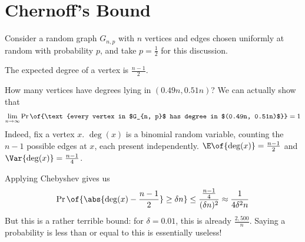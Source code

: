\section{Chernoff's Bound}

Consider a random graph $G_{n, p}$ with $n$ vertices and edges chosen uniformly at random with probability $p$, and take $p = \frac{1}{2}$ for this discussion.

The expected degree of a vertex is $\frac{n-1}{2}$.

How many vertices have degrees lying in $(0.49n, 0.51n)$? We can actually show that
\begin{align*}
    \lim_{n \to \infty} \Pr\of{\text{every vertex in $G_{n, p}$ has degree in $(0.49n, 0.51n)$}} = 1
\end{align*}
Indeed, fix a vertex $x$. $\deg(x)$ is a binomial random variable, counting the $n - 1$ possible edges at $x$, each present independently. $\E\of{\deg(x)} = \frac{n-1}{2}$ and $\Var{\deg(x)} = \frac{n-1}{4}$.

Applying Chebyshev gives us
\begin{align*}
    \Pr\of{\abs{\deg(x) - \frac{n-1}{2}} \geq \delta n} \leq \frac{\frac{n-1}{4}}{(\delta n)^2}
    \approx \frac{1}{4 \delta^2 n}
\end{align*}
But this is a rather terrible bound: for $\delta = 0.01$, this is already $\frac{2,500}{n}$. Saying a probability is less than or equal to this is essentially useless!

